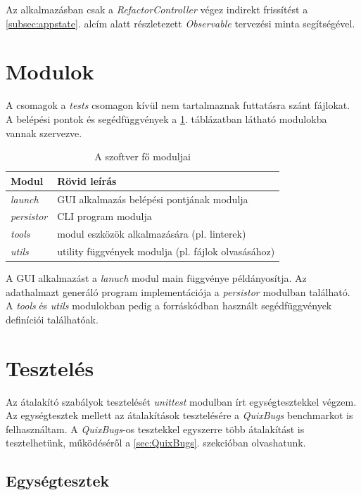 Az alkalmazásban csak a \emph{RefactorController} végez indirekt frissítést a
\ref{subsec:appstate}. alcím alatt részletezett \emph{Observable} tervezési minta
segítségével. 

\section{Modulok}
\label{sec:modules}

A csomagok a \emph{tests} csomagon kívül nem tartalmaznak futtatásra szánt fájlokat.
A belépési pontok és segédfüggvények a \ref{tab:modules}. táblázatban
látható modulokba vannak szervezve.

\begin{table}[H]
	\centering
	\begin{tabular}{ | m{} | m{} | }
		\hline
		\textbf{Modul} & \textbf{Rövid leírás} \\
		\hline \hline
		\emph{launch} & GUI alkalmazás belépési pontjának modulja \\
		\hline
		\emph{persistor} & CLI program modulja \\
		\hline
		\emph{tools} & modul eszközök alkalmazására (pl. linterek) \\
		\hline
		\emph{utils} & utility függvények modulja (pl. fájlok olvasásához)  \\
		\hline
	\end{tabular}
	\caption{A szoftver fő moduljai}
	\label{tab:modules}
\end{table}

A GUI alkalmazást a \emph{lanuch} modul main függvénye példányosítja.
Az adathalmazt generáló program implementációja a \emph{persistor} modulban található.
A \emph{tools} és \emph{utils} modulokban pedig a forráskódban használt
segédfüggvények definíciói találhatóak.

\pagebreak

\section{Tesztelés}

Az átalakító szabályok tesztelését \emph{unittest} modulban írt egységtesztekkel végzem.
Az egységtesztek mellett az átalakítások tesztelésére a \emph{QuixBugs}
benchmarkot \cite{QuixBugs} is felhasználtam.
A \emph{QuixBugs}-os tesztekkel egyszerre több átalakítást is tesztelhetünk,
működéséről a \ref{sec:QuixBugs}. szekcióban olvashatunk.

\subsection{Egységtesztek}

